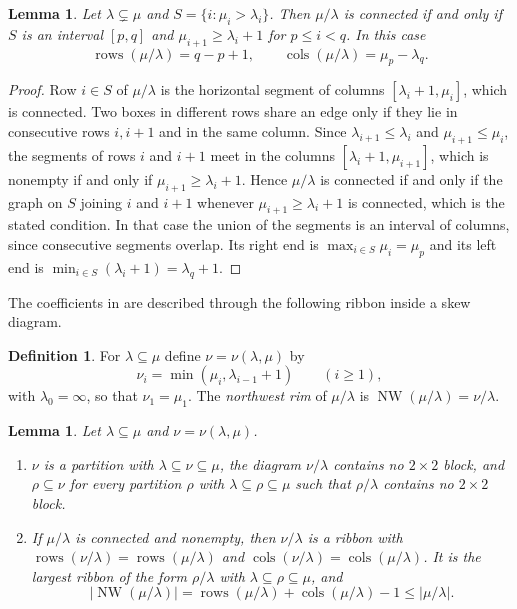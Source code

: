\documentclass[11pt]{amsart}
\numberwithin{equation}{section}
\newtheorem{lemma}[theorem]{Lemma}
\theoremstyle{definition}
\newtheorem{definition}[theorem]{Definition}
\theoremstyle{remark}
\newcommand{\rows}{\operatorname{rows}}
\newcommand{\cols}{\operatorname{cols}}
\newcommand{\NW}{\operatorname{NW}}
\begin{document}
\begin{lemma}\label{lem:connected}
Let $\lambda\subsetneq\mu$ and $S=\{i:\mu_i>\lambda_i\}$. Then $\mu/\lambda$
is connected if and only if $S$ is an interval $[p,q]$ and
$\mu_{i+1}\geq\lambda_i+1$ for $p\leq i<q$. In this case
\[
 \rows(\mu/\lambda)=q-p+1,
 \qquad
 \cols(\mu/\lambda)=\mu_p-\lambda_q .
\]
\end{lemma}

\begin{proof}
Row $i\in S$ of $\mu/\lambda$ is the horizontal segment of columns
$[\lambda_i+1,\mu_i]$, which is connected. Two boxes in different rows
share an edge only if they lie in consecutive rows $i,i+1$ and in the same
column. Since $\lambda_{i+1}\leq\lambda_i$ and $\mu_{i+1}\leq\mu_i$, the
segments of rows $i$ and $i+1$ meet in the columns $[\lambda_i+1,\mu_{i+1}]$,
which is nonempty if and only if $\mu_{i+1}\geq\lambda_i+1$. Hence
$\mu/\lambda$ is connected if and only if the graph on $S$ joining $i$ and
$i+1$ whenever $\mu_{i+1}\geq\lambda_i+1$ is connected, which is the stated
condition. In that case the union of the segments is an interval of
columns, since consecutive segments overlap. Its right end is
$\max_{i\in S}\mu_i=\mu_p$ and its left end is
$\min_{i\in S}(\lambda_i+1)=\lambda_q+1$.
\end{proof}

The coefficients in \cite{NHST,Kundu} are described through the following ribbon inside a skew diagram.

\begin{definition}\label{def:NW}
For $\lambda\subseteq\mu$ define $\nu=\nu(\lambda,\mu)$ by
\[
 \nu_i=\min(\mu_i,\lambda_{i-1}+1)\qquad(i\geq1),
\]
with $\lambda_0=\infty$, so that $\nu_1=\mu_1$. The \emph{northwest rim} of
$\mu/\lambda$ is $\NW(\mu/\lambda)=\nu/\lambda$.
\end{definition}

\begin{lemma}\label{lem:NW}
Let $\lambda\subseteq\mu$ and $\nu=\nu(\lambda,\mu)$.
\begin{enumerate}[label=\textup{(\alph*)}]
\item $\nu$ is a partition with $\lambda\subseteq\nu\subseteq\mu$, the
diagram $\nu/\lambda$ contains no $2\times2$ block, and $\rho\subseteq\nu$ for
every partition $\rho$ with $\lambda\subseteq\rho\subseteq\mu$ such that
$\rho/\lambda$ contains no $2\times2$ block.
\item If $\mu/\lambda$ is connected and nonempty, then $\nu/\lambda$ is a
ribbon with $\rows(\nu/\lambda)=\rows(\mu/\lambda)$ and
$\cols(\nu/\lambda)=\cols(\mu/\lambda)$. It is the largest ribbon of the form
$\rho/\lambda$ with $\lambda\subseteq\rho\subseteq\mu$, and
\[
 |\NW(\mu/\lambda)|=\rows(\mu/\lambda)+\cols(\mu/\lambda)-1\leq|\mu/\lambda| .
\]
\end{enumerate}
\end{lemma}
\end{document}

